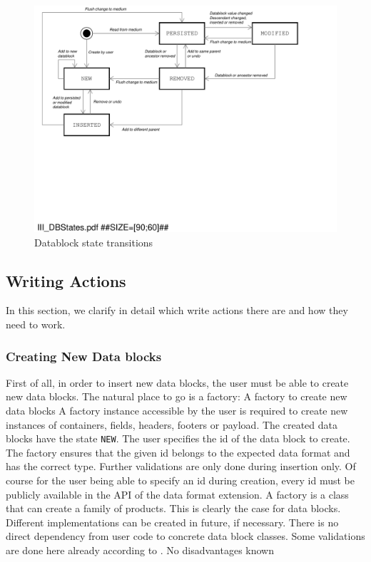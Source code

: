 \begin{figure}[htbp]
  \centering
  \includegraphics[width=1.0\linewidth]{figures/III_DBStates.pdf}
  \caption{Datablock state transitions}
  \label{fig:III_DBStates.pdf}
\end{figure}

\subsection{Writing Actions}%
\label{sec:WritingActions}%

In this section, we clarify in detail which write actions there are and how they need to work.

\subsubsection{Creating New Data blocks}%
\label{sec:CreatingNewDatablocks}%

First of all, in order to insert new data blocks, the user must be able to create new data blocks. The natural place to go is a factory:
{%
A factory to create new data blocks
}
{%
A factory instance accessible by the user is required to create new instances of containers, fields, headers, footers or payload. The created data blocks have the state \texttt{NEW}. The user specifies the id of the data block to create. The factory ensures that the given id belongs to the expected data format and has the correct type. Further validations are only done during insertion only. Of course for the user being able to specify an id during creation, every id must be publicly available in the API of the data format extension.
}
{%
A factory is a class that can create a family of products. This is clearly the case for data blocks. Different implementations can be created in future, if necessary. There is no direct dependency from user code to concrete data block classes. Some validations are done here already according to .
}
{%
No disadvantages known
}

